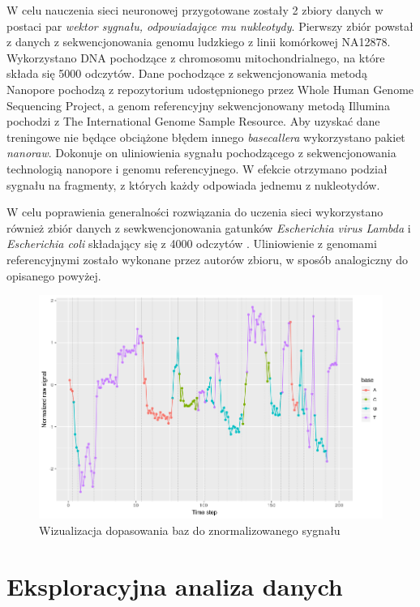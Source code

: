 \documentclass[a4paper,11pt,twoside]{report}
\theoremstyle{definition}
\begin{document}
W celu nauczenia sieci neuronowej przygotowane zostały 2 zbiory danych w postaci par \textit{wektor sygnału, odpowiadające mu nukleotydy}.
Pierwszy zbiór powstał z danych z sekwencjonowania genomu ludzkiego z linii komórkowej NA12878. Wykorzystano DNA pochodzące z chromosomu mitochondrialnego, na które składa się 5000 odczytów.
Dane pochodzące z sekwencjonowania metodą Nanopore pochodzą z repozytorium udostępnionego przez Whole Human Genome Sequencing Project\cite{nanoporeHuman}, a genom referencyjny sekwencjonowany metodą Illumina pochodzi z The International Genome Sample Resource\cite{refGenome}. Aby uzyskać dane treningowe nie będące obciążone błędem innego \textit{basecallera} wykorzystano pakiet \textit{nanoraw}\cite{nanoraw}. Dokonuje on uliniowienia sygnału pochodzącego z sekwencjonowania technologią nanopore i genomu referencyjnego. W efekcie otrzymano podział sygnału na fragmenty, z których każdy odpowiada jednemu z nukleotydów.

W celu poprawienia generalności rozwiązania do uczenia sieci wykorzystano również zbiór danych z sewkwencjonowania gatunków \textit{Escherichia virus Lambda} i \textit{Escherichia coli} składający się z 4000 odczytów \cite{chironData}. Uliniowienie z genomami referencyjnymi zostało wykonane przez autorów zbioru, w sposób analogiczny do opisanego powyżej.

\begin{figure}[h!]
	\centering
	\includegraphics[scale=0.7]{squiggle}
	\caption{Wizualizacja dopasowania baz do znormalizowanego sygnału}
\end{figure}

\section*{Eksploracyjna analiza danych}
\end{document}
